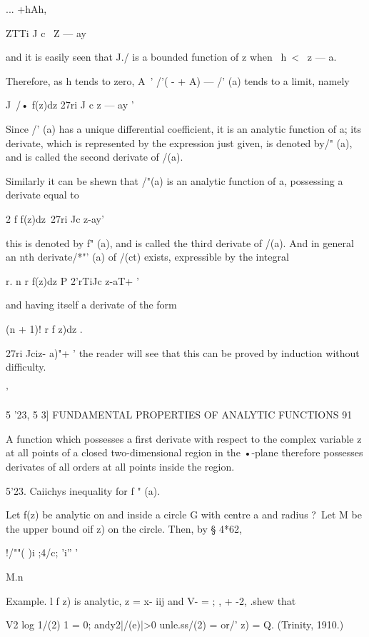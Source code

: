 {{... +hAh, 

ZTTi J c \ Z — ay 

and it is easily seen that J./  is a bounded function of z when \ h\ <  \ z — a.  

Therefore, as h tends to zero, A~'  /'( - + A) — /' (a)  tends to a limit, 
namely 

J\  /• f(z)dz 
27ri J c  z — ay ' 

Since /' (a) has a unique differential coefficient, it is an analytic function 
of a; its derivate, which is represented by the expression just given, is 
denoted by/" (a), and is called the second derivate of /(a). 

Similarly it can be shewn that /"(a) is an analytic function of a, possessing 
a derivate equal to 

2  f f(z)dz\  
27ri Jc z-ay' 

this is denoted by f" (a), and is called the third derivate of /(a). And in 
general an nth derivate/*"' (a) of /(ct) exists, expressible by the integral 

r. n r f(z)dz 
P  2'rTiJc z-aT+ ' 

and having itself a derivate of the form 

(n + 1)! r f z)dz . 



27ri Jciz- a)"+  ' 
the reader will see that this can be proved by induction without difficulty. 



 '   



5 '23, 5 3] FUNDAMENTAL PROPERTIES OF ANALYTIC FUNCTIONS 91 

A function which possesses a first derivate with respect to the complex 
variable z at all points of a closed two-dimensional region in the  •-plane 
therefore possesses derivates of all orders at all points inside the region. 

5'23. Caiichys inequality for f  "  (a). 

Let f(z) be analytic on and inside a circle G with centre a and radius ?\ 
Let M be the upper bound oif z) on the circle. Then, by § 4*62, 

!/""( )i ;4/c; 'i'' ' 

M.n\ 

Example. l f z) is analytic, z = x- iij and V- = ; , +  -2, .shew that 

V2 log 1/(2) 1 = 0; andy2|/(e)|>0 
unle.ss/(2) = or/'  z) = Q. (Trinity, 1910.) 

}}
